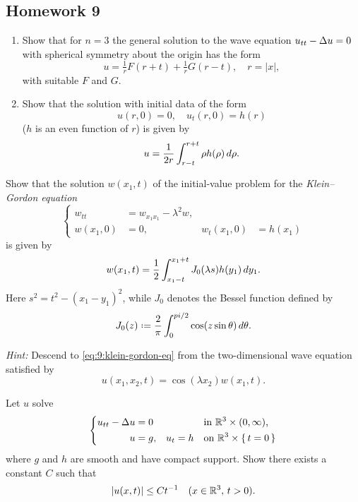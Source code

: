 \subsection{Homework 9}
\begin{problem}
  \begin{enumerate}[label=(\alph*),noitemsep]
  \item Show that for \(n=3\) the general solution to the wave equation
    \(u_{tt}-\Delta u=0\) with spherical symmetry about the origin has the
    form
    \[
      u=\tfrac{1}{r}F(r+t)+\tfrac{1}{r}G(r-t),\quad r=|x|,
    \]
    with suitable \(F\) and \(G\).
  \item Show that the solution with initial data of the form
    \[
      u(r,0)=0,\quad u_t(r,0)=h(r)
    \]
    (\(h\) is an even function of \(r\)) is given by
    \[
      u=\frac{1}{2r}\int_{r-t}^{r+t} \rho h(\rho)\mathop{}\!d \rho.
    \]
  \end{enumerate}
\end{problem}
\begin{solution*}
\end{solution*}

\begin{problem}
  Show that the solution \(w(x_1,t)\) of the initial-value problem for the
  \emph{Klein--Gordon equation}
  \begin{equation}
    \label{eq:9:klein-gordon-eq}
    \left\{
      \begin{aligned}
        w_{tt}&=w_{x_1x_1}-\lambda^2w,\\
        w(x_1,0)&=0,&w_t(x_1,0)&=h(x_1)
      \end{aligned}
    \right.
  \end{equation}
  is given by
  \[
    w(x_1,t)=\frac{1}{2}\int_{x_1-t}^{x_1+t}J_0(\lambda s) h(y_1)\mathop{}\!d y_1.
  \]
  Here \(s^2=t^2-(x_1-y_1)^2\), while \(J_0\) denotes the Bessel function
  defined by
  \[
    J_0(z)\defeq \frac{2}{\pi}\int_0^{pi/2}\cos(z\sin\theta)\diff\theta.
  \]

  \noindent\emph{Hint:} Descend to \eqref{eq:9:klein-gordon-eq} from the
  two-dimensional wave equation satisfied by
  \[
    u(x_1,x_2,t)=\cos(\lambda x_2)w(x_1,t).
  \]
\end{problem}
\begin{solution*}
\end{solution*}

\begin{problem}
  Let \(u\) solve
  \[
    \left\{
      \begin{aligned}
        u_{tt}-\Delta u&=0&&&&\text{in \(\mathbb{R}^3\times(0,\infty)\),}\\
        u&=g,&u_t&=h&&\text{on \(\mathbb{R}^3\times\{\,t=0\,\}\)}
      \end{aligned}
    \right.
  \]
  where \(g\) and \(h\) are smooth and have compact support. Show there
  exists a constant \(C\) such that
  \[
    |u(x,t)|\leq Ct^{-1}\quad(x\in\mathbb{R}^3,\,t>0).
  \]
\end{problem}
\begin{solution*}
\end{solution*}

